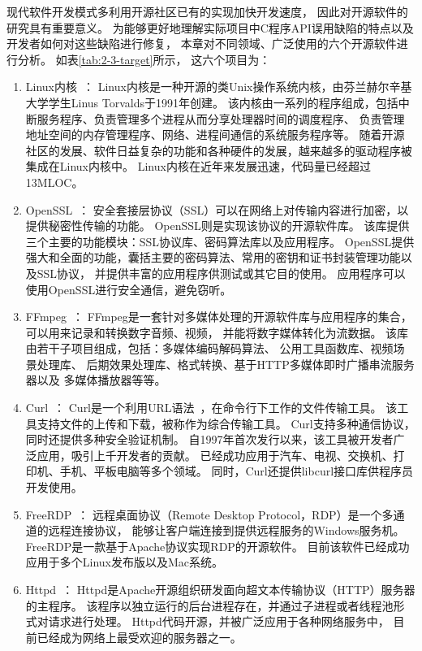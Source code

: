 现代软件开发模式多利用开源社区已有的实现加快开发速度，
因此对开源软件的研究具有重要意义。
为能够更好地理解实际项目中C程序API误用缺陷的特点以及开发者如何对这些缺陷进行修复，
本章对不同领域、广泛使用的六个开源软件进行分析。
如表\ref{tab:2-3-target}所示，
这六个项目为：
\begin{enumerate}
	\item Linux内核~\cite{linux}：
	Linux内核是一种开源的类Unix操作系统内核，由芬兰赫尔辛基大学学生Linus Torvalds于1991年创建。
	该内核由一系列的程序组成，包括中断服务程序、负责管理多个进程从而分享处理器时间的调度程序、
	负责管理地址空间的内存管理程序、网络、进程间通信的系统服务程序等。
	随着开源社区的发展、软件日益复杂的功能和各种硬件的发展，越来越多的驱动程序被集成在Linux内核中。
	Linux内核在近年来发展迅速，代码量已经超过13MLOC。
	
	\item OpenSSL~\cite{openssl}：
	安全套接层协议（SSL）可以在网络上对传输内容进行加密，以提供秘密性传输的功能。
	OpenSSL则是实现该协议的开源软件库。
	该库提供三个主要的功能模块：SSL协议库、密码算法库以及应用程序。
	OpenSSL提供强大和全面的功能，囊括主要的密码算法、常用的密钥和证书封装管理功能以及SSL协议，
	并提供丰富的应用程序供测试或其它目的使用。
	应用程序可以使用OpenSSL进行安全通信，避免窃听。
	
	
	\item FFmpeg~\cite{ffmpeg}：
	FFmpeg是一套针对多媒体处理的开源软件库与应用程序的集合，
	可以用来记录和转换数字音频、视频，
	并能将数字媒体转化为流数据。
	该库由若干子项目组成，包括：多媒体编码解码算法、
	公用工具函数库、视频场景处理库、
	后期效果处理库、格式转换、基于HTTP多媒体即时广播串流服务器以及
	多媒体播放器等等。
	
	\item Curl~\cite{curl}：
	Curl是一个利用URL语法~\cite{url}，在命令行下工作的文件传输工具。
	该工具支持文件的上传和下载，被称作为综合传输工具。
	Curl支持多种通信协议，同时还提供多种安全验证机制。
	自1997年首次发行以来，该工具被开发者广泛应用，吸引上千开发者的贡献。
	已经成功应用于汽车、电视、交换机、打印机、手机、平板电脑等多个领域。
	同时，Curl还提供libcurl接口库供程序员开发使用。
	
	\item FreeRDP~\cite{freerdp}：
	远程桌面协议（Remote Desktop Protocol，RDP）是一个多通道的远程连接协议，
	能够让客户端连接到提供远程服务的Windows服务机。
	FreeRDP是一款基于Apache协议实现RDP的开源软件。
	目前该软件已经成功应用于多个Linux发布版以及Mac系统。
	
	
	\item Httpd~\cite{httpd}：
	Httpd是Apache开源组织研发面向超文本传输协议（HTTP）服务器的主程序。
	该程序以独立运行的后台进程存在，并通过子进程或者线程池形式对请求进行处理。
	Httpd代码开源，并被广泛应用于各种网络服务中，
	目前已经成为网络上最受欢迎的服务器之一。
	
\end{enumerate}

